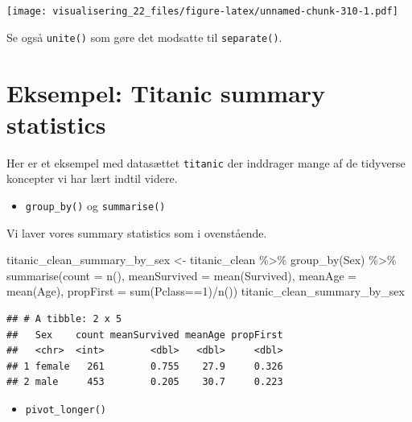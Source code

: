 \documentclass[
]{book}
\newenvironment{Shaded}{\begin{snugshade}}{\end{snugshade}}
\newcommand{\AttributeTok}[1]{\textcolor[rgb]{0.77,0.63,0.00}{#1}}
\newcommand{\DecValTok}[1]{\textcolor[rgb]{0.00,0.00,0.81}{#1}}
\newcommand{\FunctionTok}[1]{\textcolor[rgb]{0.00,0.00,0.00}{#1}}
\newcommand{\NormalTok}[1]{#1}
\newcommand{\OtherTok}[1]{\textcolor[rgb]{0.56,0.35,0.01}{#1}}
\newcommand{\SpecialCharTok}[1]{\textcolor[rgb]{0.00,0.00,0.00}{#1}}
\providecommand{\tightlist}{%
  \setlength{\itemsep}{0pt}\setlength{\parskip}{0pt}}
\begin{document}
\texttt{[image: visualisering\_22\_files/figure-latex/unnamed-chunk-310-1.pdf]}

Se også \texttt{unite()} som gøre det modsatte til \texttt{separate()}.

\hypertarget{eksempel-titanic-summary-statistics}{%
\section{Eksempel: Titanic summary statistics}\label{eksempel-titanic-summary-statistics}}

Her er et eksempel med datasættet \texttt{titanic} der inddrager mange af de tidyverse koncepter vi har lært indtil videre.

\begin{itemize}
\tightlist
\item
  \texttt{group\_by()} og \texttt{summarise()}
\end{itemize}

Vi laver vores summary statistics som i ovenstående.

\begin{Shaded}
\begin{Highlighting}[]
\NormalTok{titanic\_clean\_summary\_by\_sex }\OtherTok{\textless{}{-}}\NormalTok{ titanic\_clean }\SpecialCharTok{\%\textgreater{}\%}  
  \FunctionTok{group\_by}\NormalTok{(Sex) }\SpecialCharTok{\%\textgreater{}\%} 
  \FunctionTok{summarise}\NormalTok{(}\AttributeTok{count =} \FunctionTok{n}\NormalTok{(),}
            \AttributeTok{meanSurvived =} \FunctionTok{mean}\NormalTok{(Survived),}
            \AttributeTok{meanAge =} \FunctionTok{mean}\NormalTok{(Age),}
            \AttributeTok{propFirst =} \FunctionTok{sum}\NormalTok{(Pclass}\SpecialCharTok{==}\DecValTok{1}\NormalTok{)}\SpecialCharTok{/}\FunctionTok{n}\NormalTok{())}
\NormalTok{titanic\_clean\_summary\_by\_sex}
\end{Highlighting}
\end{Shaded}

\begin{verbatim}
## # A tibble: 2 x 5
##   Sex    count meanSurvived meanAge propFirst
##   <chr>  <int>        <dbl>   <dbl>     <dbl>
## 1 female   261        0.755    27.9     0.326
## 2 male     453        0.205    30.7     0.223
\end{verbatim}

\begin{itemize}
\tightlist
\item
  \texttt{pivot\_longer()}
\end{itemize}
\end{document}
